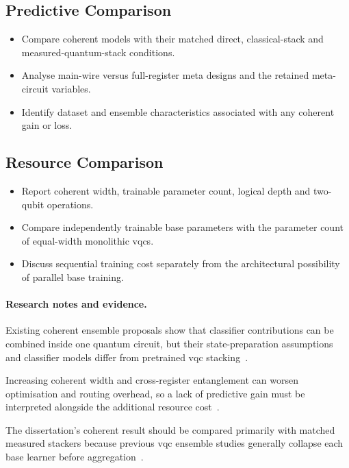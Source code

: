 \documentclass[]{UCD_CS_MSc_AAI_Report}
\newcommand{\challenge}[1]{{\color{red}#1}}
\newcommand{\comparison}[1]{{\color{pink!70!violet}#1}}
\newcommand{\gap}[1]{{\color{black}#1}}
\newcommand{\researchnotes}{\paragraph{Research notes and evidence.}}
\begin{document}
\subsection{Predictive Comparison}
\begin{itemize}
    \item Compare coherent models with their matched direct, classical-stack and measured-quantum-stack conditions.
    \item Analyse main-wire versus full-register meta designs and the retained meta-circuit variables.
    \item Identify dataset and ensemble characteristics associated with any coherent gain or loss.
\end{itemize}

\subsection{Resource Comparison}
\begin{itemize}
    \item Report coherent width, trainable parameter count, logical depth and two-qubit operations.
    \item Compare independently trainable base parameters with the parameter count of equal-width monolithic \acp{vqc}.
    \item Discuss sequential training cost separately from the architectural possibility of parallel base training.
\end{itemize}

\researchnotes
\begin{itemize}
    \comparison{\item Existing coherent ensemble proposals show that classifier contributions can be combined inside one quantum circuit, but their state-preparation assumptions and classifier models differ from pretrained \ac{vqc} stacking~\cite{schuld_quantum_2018,tolotti_weighted_2025}.}
    \challenge{\item Increasing coherent width and cross-register entanglement can worsen optimisation and routing overhead, so a lack of predictive gain must be interpreted alongside the additional resource cost~\cite{cerezo_challenges_2022,resch_quantum_2019}.}
    \gap{\item The dissertation's coherent result should be compared primarily with matched measured stackers because previous \ac{vqc} ensemble studies generally collapse each base learner before aggregation~\cite{mcfarthing_classical_2024,incudini_resource_2023}.}
\end{itemize}
\end{document}
